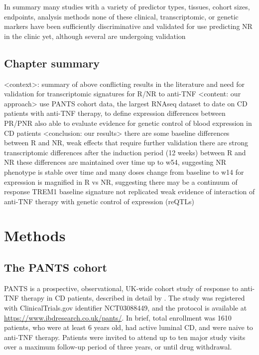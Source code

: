 \begin{outline}
\1 In summary many studies with a variety of predictor types, tissues, cohort sizes, endpoints, analysis methods
    \2 none of these clinical, transcriptomic, or genetic markers have been sufficiently discriminative and validated for use predicting NR in the clinic yet, although several are undergoing validation \autocite{noor2020PersonalisedMedicineCrohn}

\subsection{Chapter summary}

\1 <context>: summary of above
    \2 conflicting results in the literature and need for validation for transcriptomic signatures for R/NR to anti-TNF 
\1 <content: our approach> 
    \2 use PANTS cohort data, the largest RNAseq dataset to date on CD patients with anti-TNF therapy, to define expression differences between PR/PNR
    \2 also able to evaluate evidence for genetic control of blood expression in CD patients
\1 <conclusion: our results> 
    \2 there are some baseline differences between R and NR, weak effects that require further validation
    \2 there are strong transcriptomic differences after the induction period (12 weeks) between R and NR
    \2 these differences are maintained over time up to w54, suggesting NR phenotype is stable over time and many doses
    \2 change from baseline to w14 for expression is magnified in R vs NR, suggesting there may be a continuum of response
    \2 TREM1 baseline signature not replicated
    \2 weak evidence of interaction of anti-TNF therapy with genetic control of expression (reQTLs)

\section{Methods}

\subsection{The PANTS cohort}

\gls{PANTS} is a prospective, observational, UK-wide cohort study of response to \gls{anti-TNF} therapy in \gls{CD} patients, described in detail by \textcite{kennedy2019PredictorsAntiTNFTreatment}.
The study was registered with ClinicalTrials.gov identifier NCT03088449, and the protocol is available at \url{https://www.ibdresearch.co.uk/pants/}.
In brief, total enrollment was 1610 patients, who were at least 6 years old, had active luminal \gls{CD}, and were naive to \gls{anti-TNF} therapy.
Patients were invited to attend up to ten major study visits over a maximum follow-up period of three years, or until drug withdrawal.


\end{outline}
